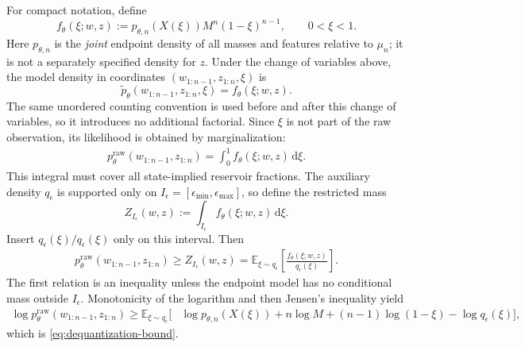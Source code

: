 \documentclass[10pt]{article}
\theoremstyle{definition}
\theoremstyle{remark}
\newcommand{\E}{\mathbb{E}}
\newcommand{\dd}{\,\mathrm{d}}
\begin{document}
For compact notation, define
\begin{equation}
  f_\theta(\xi;w,z)
  :=p_{\theta,n}(X(\xi))M^n(1-\xi)^{n-1},
  \qquad 0<\xi<1.
  \label{eq:appendix-f-xi}
\end{equation}
Here $p_{\theta,n}$ is the \emph{joint} endpoint density of all masses and
features relative to $\mu_n$; it is not a separately specified density for
$z$.  Under the change of variables above, the model density in coordinates
$(w_{1:n-1},z_{1:n},\xi)$ is
\begin{equation}
  \widetilde p_\theta(w_{1:n-1},z_{1:n},\xi)
  =f_\theta(\xi;w,z).
  \label{eq:appendix-augmented-density}
\end{equation}
The same unordered counting convention is used before and after this change
of variables, so it introduces no additional factorial.  Since $\xi$ is not
part of the raw observation, its likelihood is obtained by marginalization:
\begin{align}
  p_\theta^{\mathrm{raw}}(w_{1:n-1},z_{1:n})
  =\int_0^1 f_\theta(\xi;w,z)\dd\xi.
  \label{eq:appendix-raw-marginal}
\end{align}
This integral must cover all state-implied reservoir fractions.  The
auxiliary density $q_\epsilon$ is supported only on
$I_\epsilon=[\epsilon_{\min},\epsilon_{\max}]$, so define the restricted
mass
\begin{equation}
  Z_{I_\epsilon}(w,z)
  :=\int_{I_\epsilon}f_\theta(\xi;w,z)\dd\xi.
\end{equation}
Insert $q_\epsilon(\xi)/q_\epsilon(\xi)$ only on this interval.  Then
\begin{align}
  p_\theta^{\mathrm{raw}}(w_{1:n-1},z_{1:n})
  \geq Z_{I_\epsilon}(w,z)
  =\E_{\xi\sim q_\epsilon}\left[
    \frac{f_\theta(\xi;w,z)}{q_\epsilon(\xi)}
  \right].
  \label{eq:appendix-importance-identity}
\end{align}
The first relation is an inequality unless the endpoint model has no
conditional mass outside $I_\epsilon$.  Monotonicity of the logarithm and
then Jensen's inequality yield
\begin{align}
  \log p_\theta^{\mathrm{raw}}(w_{1:n-1},z_{1:n})
  \geq\E_{\xi\sim q_\epsilon}\Big[
    &\log p_{\theta,n}(X(\xi))
    +n\log M
    +(n-1)\log(1-\xi)
    -\log q_\epsilon(\xi)
  \Big],
  \label{eq:appendix-dequantization-bound}
\end{align}
which is \eqref{eq:dequantization-bound}.
\end{document}
